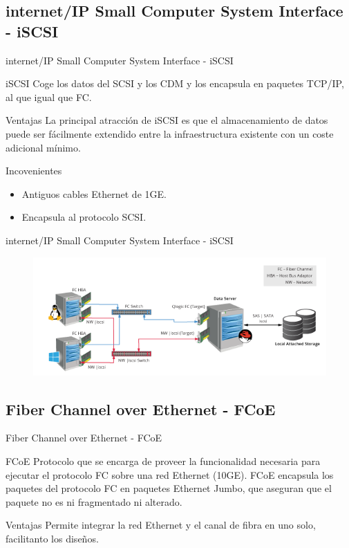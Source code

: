 \documentclass[10pt]{beamer}
\begin{document}
\subsection{internet/IP Small Computer System Interface - iSCSI}

\begin{frame}{internet/IP Small Computer System Interface - iSCSI}
\begin{alertblock}{iSCSI}
Coge los datos del SCSI y los CDM y los encapsula en paquetes TCP/IP, al que igual que FC.
\end{alertblock}
\begin{alertblock}{Ventajas}
La principal atracción de iSCSI es que el almacenamiento de datos puede ser fácilmente extendido entre la infraestructura existente con un coste adicional mínimo.
\end{alertblock}

\begin{alertblock}{Incovenientes}
\begin{itemize}
\item Antiguos cables Ethernet de 1GE.
\item Encapsula al protocolo SCSI.
\end{itemize}
\end{alertblock}
\end{frame}
\begin{frame}{internet/IP Small Computer System Interface - iSCSI}
\begin{figure}[h]
\center
\includegraphics[scale=0.58]{fc1.png}
\end{figure}
\end{frame}


\subsection{Fiber Channel over Ethernet - FCoE}

\begin{frame}{Fiber Channel over Ethernet - FCoE}
\begin{alertblock}{FCoE}
Protocolo que se encarga de proveer la funcionalidad necesaria para ejecutar el protocolo FC sobre una red Ethernet (10GE). FCoE encapsula los paquetes del protocolo FC en paquetes Ethernet Jumbo, que aseguran que el paquete no es ni fragmentado ni alterado.
\end{alertblock}
\begin{alertblock}{Ventajas}
Permite integrar la red Ethernet y el canal de fibra en uno solo, facilitanto los diseños.
\end{alertblock}
\end{frame}
\end{document}
